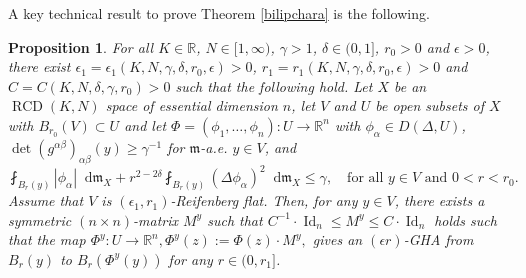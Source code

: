 \documentclass[11pt,reqno]{amsart}
\newtheorem{proposition}[theorem]{Proposition}
\theoremstyle{definition}
\numberwithin{equation}{section}
\newcommand{\di}{\mathop{}\!\mathrm{d}}
\newcommand{\meas}{\mathfrak{m}}
\DeclareMathOperator{\Id}{Id}
\DeclareMathOperator{\RCD}{RCD}
\begin{document}
      
A key technical result to prove Theorem \ref{bilipchara} is the following.
\begin{proposition}\label{keyprop}
For all $K \in \mathbb{R}$, $N \in [1, \infty)$, $\gamma>1$, $\delta \in (0, 1]$,  $r_0>0$ and $\epsilon>0$, there exist $\epsilon_1=\epsilon_1(K, N, \gamma, \delta,  r_0, \epsilon)>0$, $r_1=r_1(K, N, \gamma, \delta,  r_0, \epsilon)>0$ and $C=C(K, N, \delta, \gamma,  r_0)>0$ such that the following hold.
Let $X$ be an $\RCD(K, N)$ space of essential dimension $n$, 
let $V$ and $U$ be open subsets of $X$ with $B_{r_0}(V) \subset U$
and let $\Phi=(\phi_1, \ldots, \phi_n):U \to \mathbb{R}^n$ with
$\phi_{\alpha} \in D(\Delta, U)$,
$
\det\left(g^{\alpha \beta}\right)_{\alpha \beta}(y) \ge \gamma^{-1}$ for $\meas$-a.e. $y \in V$,
and
    \begin{equation}
        \fint_{B_r (y)}|\phi_{\alpha}|\di \meas_X+r^{2-2\delta}\fint_{B_r(y)}(\Delta \phi_{\alpha})^2\di \meas_X \le \gamma,\quad \text{for all $y \in V$ and $0<r<r_0$.}
    \end{equation}
Assume that $V$ is $(\epsilon_1, r_1)$-Reifenberg flat.
Then, for any $y \in V$, there exists a symmetric $(n\times n)$-matrix $M^y$ such that  $
 C^{-1} \cdot \Id_n \le M^y \le C \cdot \Id_n
$ 
holds such that the map  
$
    \Phi^y:U \to \mathbb{R}^n, \Phi^y(z) := \Phi(z) \cdot M^y,
$
gives an $(\epsilon r)$-GHA from $B_r(y)$ to $B_r(\Phi^y(y))$ for any $r \in (0, r_1]$.  
\end{proposition}
\end{document}
